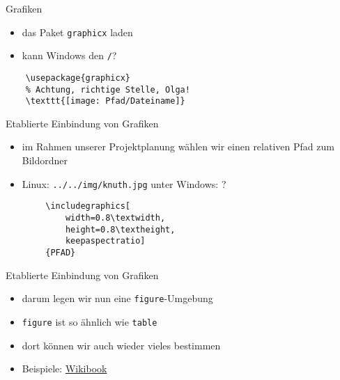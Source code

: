 \begin{frame}[fragile]{Grafiken}
    \begin{itemize}[<+->]
        \item das Paket \texttt{graphicx} laden
        \item kann Windows den \texttt{/}?
    \end{itemize}
    \begin{lstlisting}
    \usepackage{graphicx}
    % Achtung, richtige Stelle, Olga!
    \texttt{[image: Pfad/Dateiname]}
    \end{lstlisting}
\end{frame}

\begin{frame}[fragile]{Etablierte Einbindung von Grafiken}
    \begin{itemize}[<+->]
        \item im Rahmen unserer Projektplanung wählen wir einen relativen Pfad zum Bildordner
        \item Linux: \texttt{../../img/knuth.jpg} unter Windows: ?
    \end{itemize}
        \begin{lstlisting}
        \includegraphics[
            width=0.8\textwidth,
            height=0.8\textheight,
            keepaspectratio]
        {PFAD}
        \end{lstlisting}
\end{frame}

\begin{frame}[fragile]{Etablierte Einbindung von Grafiken}
    \begin{itemize}[<+->]
        \item darum legen wir nun eine \texttt{figure}-Umgebung
        \item \texttt{figure} ist so ähnlich wie \texttt{table}
        \item dort können wir auch wieder vieles bestimmen
        \item Beispiele: \href{https://en.wikibooks.org/wiki/LaTeX/Floats,_Figures_and_Captions}{Wikibook}
    \end{itemize}
\end{frame}
